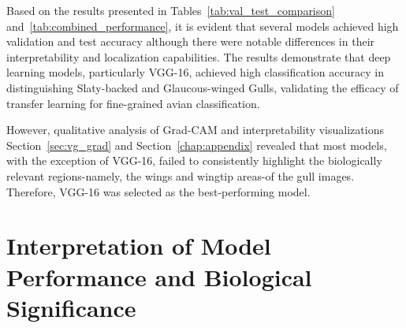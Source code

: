 \documentclass[a4paper,12pt]{report}
\begin{document}
\begin{table}[H]
    \centering
    \caption{Comprehensive Model Performance Metrics on Test Dataset}
    \label{tab:combined_performance}
\end{table}

Based on the results presented in Tables~\ref{tab:val_test_comparison} and~\ref{tab:combined_performance}, it is evident that several models achieved high validation and test accuracy although there were notable differences in their interpretability and localization capabilities. The results demonstrate that deep learning models, particularly VGG-16, achieved high classification accuracy in distinguishing Slaty-backed and Glaucous-winged Gulls, validating the efficacy of transfer learning for fine-grained avian classification.

However, qualitative analysis of Grad-CAM and interpretability visualizations Section~\ref{sec:vg_grad} and Section~\ref{chap:appendix} revealed that most models, with the exception of VGG-16, failed to consistently highlight the biologically relevant regions-namely, the wings and wingtip areas-of the gull images. Therefore, VGG-16 was selected as the best-performing model.

\section{Interpretation of Model Performance and Biological Significance}
\end{document}
